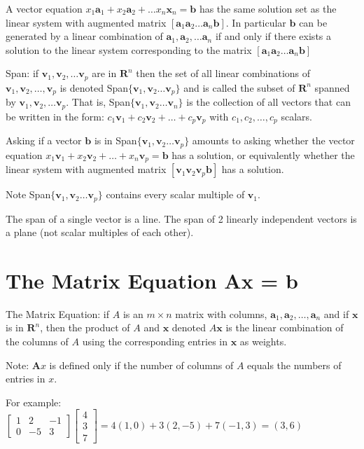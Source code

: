 \documentclass[../linalg.tex]{subfiles}
\begin{document}
A vector equation $x_1\textbf{a}_1+x_2\textbf{a}_2+\dots x_n\textbf{x}_n=\textbf{b}$ has the same solution set as the linear system with augmented matrix 
$[\textbf{a}_1 \textbf{a}_2 \dots \textbf{a}_n \textbf{b}]$. In particular $\textbf{b}$ can be generated by a linear combination of $\textbf{a}_1,\textbf{a}_2,\dots\textbf{a}_n$ if and only if there exists a solution to the linear system corresponding to the matrix $[\textbf{a}_1 \textbf{a}_2 \dots \textbf{a}_n \textbf{b}]$

Span: if $\textbf{v}_1,\textbf{v}_2,\dots \textbf{v}_p$ are in $\textbf{R}^n$ then the set of all linear combinations of $\textbf{v}_1,\textbf{v}_2,\dots,\textbf{v}_p$ is denoted Span$\{\textbf{v}_1,\textbf{v}_2\dots\textbf{v}_p\}$ and is called the subset of 
$\textbf{R}^n$ spanned by $\textbf{v}_1,\textbf{v}_2,\dots \textbf{v}_p$. That is, Span$\{\textbf{v}_1,\textbf{v}_2\dots\textbf{v}_n\}$ is the collection of all vectors 
that can be written in the form: $c_1\textbf{v}_1+c_2\textbf{v}_2+\dots+c_p\textbf{v}_p$ with $c_1,c_2,\dots,c_p$ scalars.

Asking if a vector $\textbf{b}$ is in Span$\{\textbf{v}_1,\textbf{v}_2\dots\textbf{v}_p\}$ amounts to asking whether the vector equation $x_1\textbf{v}_1+x_2\textbf{v}_2+\dots +x_n\textbf{v}_p=\textbf{b}$ has a solution,
or equivalently whether the linear system with augmented matrix $[\textbf{v}_1 \textbf{v}_2 \textbf{v}_p \textbf{b}]$ has a solution.

Note Span$\{\textbf{v}_1,\textbf{v}_2\dots\textbf{v}_p\}$ contains every scalar multiple of $\textbf{v}_1$. 

The span of a single vector is a line. The span of 2 linearly independent vectors is a plane (not scalar multiples of each other). 

\section{The Matrix Equation Ax = b}
The Matrix Equation: if $A$ is an $m\times n$ matrix with columns, $\textbf{a}_1,\textbf{a}_2,\dots,\textbf{a}_n$ and if $\textbf{x}$ is in $\textbf{R}^n$, then the product of $A$ 
and $\textbf{x}$ denoted $A\textbf{x}$ is the linear combination of the columns of $A$ using the corresponding entries in $\textbf{x}$ as weights.

Note: $\textbf{A}x$ is defined only if the number of columns of $A$ equals the numbers of entries in $x$.

For example: $\begin{bmatrix}
    1 & 2 & -1 \\
    0 & -5 & 3
\end{bmatrix} \begin{bmatrix}
    4 \\ 3 \\ 7
\end{bmatrix} = 4(1,0)+3(2,-5)+7(-1,3)=(3,6)$
\end{document}
